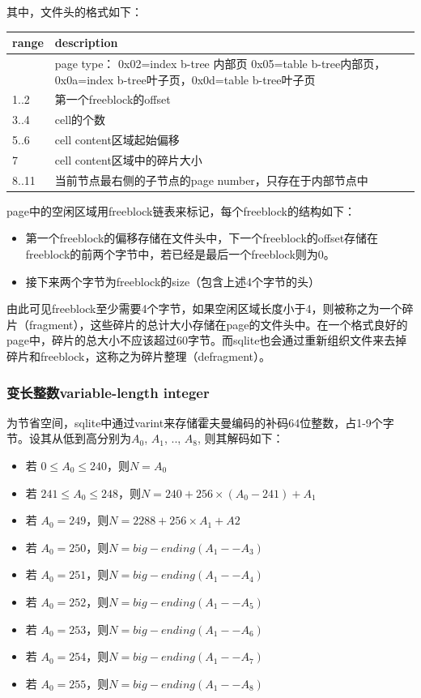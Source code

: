 \documentclass[12pt]{article}
\begin{document}
其中，文件头的格式如下：

{\def\LTcaptype{none} %
\begin{longtable}[]{@{}ll@{}}
\toprule\noalign{}
range & description \\
\midrule\noalign{}
\endhead
\bottomrule\noalign{}
\endlastfoot
0 & page type： 0x02=index b-tree 内部页 0x05=table b-tree内部页，0x0a=index b-tree叶子页，0x0d=table b-tree叶子页 \\
1..2 & 第一个freeblock的offset \\
3..4 & cell的个数 \\
5..6 & cell content区域起始偏移 \\
7 & cell content区域中的碎片大小 \\
8..11 & 当前节点最右侧的子节点的page number，只存在于内部节点中 \\
\end{longtable}
}

page中的空闲区域用freeblock链表来标记，每个freeblock的结构如下：

\begin{itemize}
\tightlist
\item
  第一个freeblock的偏移存储在文件头中，下一个freeblock的offset存储在freeblock的前两个字节中，若已经是最后一个freeblock则为0。
\item
  接下来两个字节为freeblock的size（包含上述4个字节的头）
\end{itemize}

由此可见freeblock至少需要4个字节，如果空闲区域长度小于4，则被称之为一个碎片（fragment），这些碎片的总计大小存储在page的文件头中。在一个格式良好的page中，碎片的总大小不应该超过60字节。而sqlite也会通过重新组织文件来去掉碎片和freeblock，这称之为碎片整理（defragment）。

\subsubsection{变长整数variable-length integer}\label{ux53d8ux957fux6574ux6570variable-length-integer}

为节省空间，sqlite中通过varint来存储霍夫曼编码的补码64位整数，占1-9个字节。设其从低到高分别为\(A_0\), \(A_1\), .., \(A_8\), 则其解码如下：

\begin{itemize}
\tightlist
\item
  若 \(0\leq A_0\leq 240\)，则\(N=A_0\)
\item
  若 \(241\leq A_0\leq 248\)，则\(N=240 + 256 \times (A_0 - 241) + A_1\)
\item
  若 \(A_0= 249\)，则\(N=2288 + 256 \times A_1 + A2\)
\item
  若 \(A_0= 250\)，则\(N=big-ending(A_1--A_3)\)
\item
  若 \(A_0= 251\)，则\(N=big-ending(A_1--A_4)\)
\item
  若 \(A_0= 252\)，则\(N=big-ending(A_1--A_5)\)
\item
  若 \(A_0= 253\)，则\(N=big-ending(A_1--A_6)\)
\item
  若 \(A_0= 254\)，则\(N=big-ending(A_1--A_7)\)
\item
  若 \(A_0= 255\)，则\(N=big-ending(A_1--A_8)\)
\end{itemize}
\end{document}
